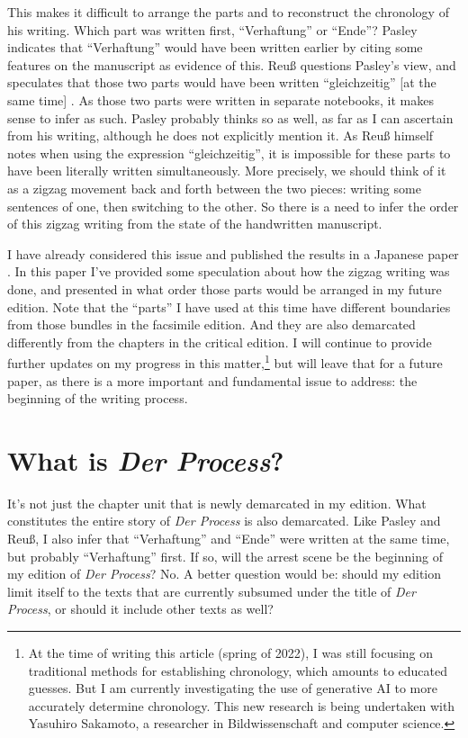 \documentclass{article}
\begin{document}
This makes it difficult to arrange the parts and to reconstruct the
chronology of his writing. Which part was written first, ``Verhaftung'' or ``Ende''?
Pasley indicates that ``Verhaftung'' would have been written earlier by citing some features on the manuscript as evidence of this. Reuß
questions Pasley's view, and speculates that those two parts would have
been written ``gleichzeitig'' {[}at the same time{]} \citep[6]{kafka_zur_1997}.
As those two parts were written in separate notebooks, it makes sense to
infer as such. Pasley probably thinks so as well, as far as I can ascertain
from his writing, although he does not explicitly mention it. As Reuß
himself notes when using the expression ``gleichzeitig'', it is
impossible for these parts to have been literally written
simultaneously. More precisely, we should think of it as a zigzag
movement back and forth between the two pieces: writing some sentences
of one, then switching to the other. So there is a need to infer the
order of this zigzag writing from the state of the handwritten
manuscript.

I have already considered this issue and published the results in a
Japanese paper \citep[see][]{myojo_taiho_2021}. In this paper I've provided some
speculation about how the zigzag writing was done, and presented in what
order those parts would be arranged in my future edition. Note that the
``parts'' I have used at this time have different boundaries from those
bundles in the facsimile edition. And they are also demarcated
differently from the chapters in the critical edition. I will continue
to provide further updates on my progress in this matter,\footnote{\label{myojo:fn:ai}At the time of writing this article (spring of 2022), I was still focusing on traditional methods for establishing chronology, which amounts to educated guesses. But I am currently investigating the use of generative AI to more accurately determine chronology. This new research is being undertaken with Yasuhiro Sakamoto, a researcher in Bildwissenschaft and computer science.} but will leave
that for a future paper, as there is a more important and fundamental
issue to address: the beginning of the writing process.

\section{ What is \emph{Der
Process}?}\label{what-is-der-process}

It's not just the chapter unit that is newly demarcated in my edition.
What constitutes the entire story of \emph{Der Process} is also
demarcated. Like Pasley and Reuß, I also infer that ``Verhaftung'' and
``Ende'' were written at the same time, but probably ``Verhaftung''
first. If so, will the arrest scene be the beginning of my edition of
\emph{Der Process}? No. A better question would be: should my
edition limit itself to the texts that are currently subsumed under the
title of \emph{Der Process}, or should it include other texts as well?
\end{document}
